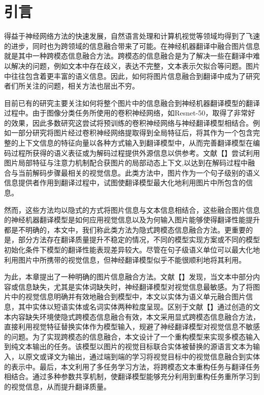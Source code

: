 \section{引言}
得益于神经网络方法的快速发展，自然语言处理和计算机视觉等领域均得到了飞速的进步，同时也为跨领域的信息融合带来了可能。在神经机器翻译中融合图片信息就是其中一种跨模态信息融合方法。跨模态的信息融合是为了解决一些在翻译中难以解决的问题，例如文本中存在歧义，表达不完整，文本表示欠拟合等问题。图片中往往包含着更丰富的语义信息。因此，如何将图片信息融合到翻译中成为了研究者们所关注的问题，相关方法也层出不穷。

目前已有的研究主要关注如何将整个图片中的信息融合到神经机器翻译模型的翻译过程中。由于图像分类任务所使用的卷积神经网络，如Resnet-50，取得了非常好的效果，因此多数研究这尝试将预训练的卷积神经网络与神经翻译模型相结合。例如一部分研究将图片经过卷积神经网络提取得到全局特征后，将其作为一个包含完整的上下文信息的特征向量以各种方式输入到翻译模型中，从而完善翻译模型在编码过程所获得的语义表征或为解码过程提供外源信息以供参考。文献【】尝试利用图片局部特征与注意力机制配合获图片的局部动态上下文,以达到在解码过程中融合与当前解码步骤最相关的视觉信息。此类方法中，图片作为一个句子级别的语义信息提供者作用到翻译过程中，试图使翻译模型最大化地利用图片中所包含的信息。

然而，这些方法均以隐式的方式将图片信息与文本信息相结合，这些融合图片信息的神经机器翻译模型是如何应用视觉信息以及为何输入图片能够使得翻译性能提升都是不明确的，本文中，我们称此类方法为隐式跨模态信息融合方法。更重要的是，部分方法存在翻译质量提升不稳定的情况，不同的模型实现方案或不同的模型初始化条件下模型的翻译性能表现差异较大。尽管在句子级语义单位可以最大化地利用图片中所携带的视觉信息，但神经翻译模型似乎不能很顺利地将其利用。

为此，本章提出了一种明确的图片信息融合方法。文献【】发现，当文本中部分内容或信息缺失，尤其是实体词缺失时，神经翻译模型对视觉信息最敏感。为了将图片中的视觉信息明确并有效地融合到模型中，本文以实体为语义单元融合图片信息，其中实体以短语实体或名词实体两种粒度呈现。区别于文献【】通过创造的文本内容缺失环境使隐式跨模态信息融合有效，本文采用显式跨模态信息融合方法，直接利用视觉特征替换实体作为模型输入，规避了神经翻译模型对视觉信息不敏感的问题。为了实现跨模态的信息融合，本文设计了一个重构模型来实现多模态输入到纯文本输出的任务。该模型以图片的视觉目标联合实体被替换的源语言文本为输入，以原文或译文为输出，通过端到端的学习将视觉目标中的视觉信息融合到实体的表示中。最后，本文利用了多任务学习方法，将跨模态文本重构任务与翻译任务相结合。通过多种参数共享机制，使翻译模型能够充分利用到重构任务重所学习到的视觉信息，从而提升翻译质量。

